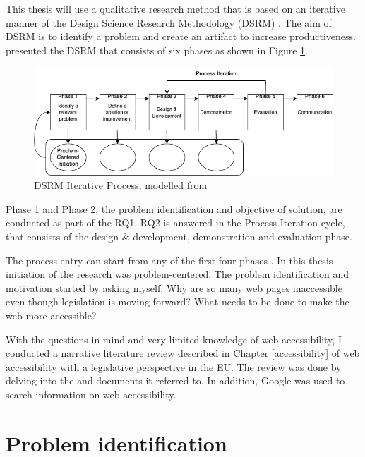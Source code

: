 This thesis will use a qualitative research method that is based on an iterative manner of the Design Science Research Methodology (DSRM) \citep{designsciencemethodology, iterativedesignscience}. The aim of DSRM is to identify a problem and create an artifact to increase productiveness. \textcite{iterativedesignscience} presented the DSRM that consists of six phases as shown in Figure \ref{fig:design-science}.

\begin{figure}
    \centering
    \includegraphics[width=1\linewidth]{DSRM.png}
    \caption{DSRM Iterative Process, modelled from \textcite{iterativedesignscience}}
    \label{fig:design-science}
\end{figure}

Phase 1 and Phase 2, the problem identification and objective of solution, are conducted as part of the RQ1. RQ2 is answered in the Process Iteration cycle, that consists of the design \& development, demonstration and evaluation phase.

The process entry can start from any of the first four phases \citep{iterativedesignscience}. In this thesis initiation of the research was problem-centered. The problem identification and motivation started by asking myself; Why are so many web pages inaccessible even though legislation is moving forward? What needs to be done to make the web more accessible? 

With the questions in mind and very limited knowledge of web accessibility, I conducted a narrative literature review described in Chapter \ref{accessibility} of web accessibility with a legislative perspective in the EU. The review was done by delving into the \textcite{eudirective2016} and documents it referred to. In addition, Google was used to search information on web accessibility.

\section{Problem identification}

